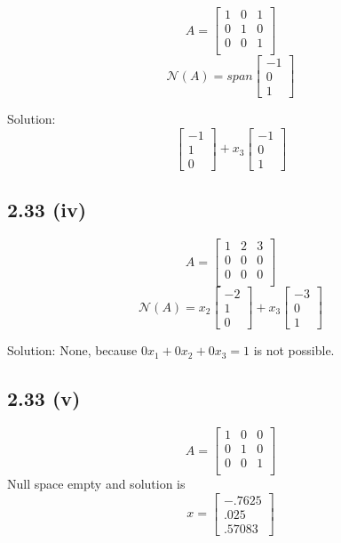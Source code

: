 \documentclass[letterpaper,12pt]{article}
\theoremstyle{definition}
\begin{document}
\[A =
\begin{bmatrix}
    1 & 0 & 1 \\
    0 & 1 & 0 \\
    0 & 0 & 1 \\
\end{bmatrix}
\]
\[ \mathscr{N} (A) = span 
\begin{bmatrix}
    -1 \\
    0\\
    1
\end{bmatrix}
\]

Solution:
\[
\begin{bmatrix}
    -1\\1\\0
\end{bmatrix}
+
x_3
\begin{bmatrix}
    -1\\0\\1
\end{bmatrix}
\]


\subsection*{2.33 (iv)}

\[A =
\begin{bmatrix}
    1 & 2 & 3 \\
    0 & 0 & 0 \\
    0 & 0 & 0 \\
\end{bmatrix}
\]
\[ \mathscr{N} (A) = x_2
\begin{bmatrix}
    -2 \\
    1\\
    0
\end{bmatrix}
+x_3
\begin{bmatrix}
    -3 \\
    0\\
    1
\end{bmatrix}
\]

Solution: None, because $0x_1 + 0x_2 +0x_3  = 1$ is not possible.

\subsection*{2.33 (v)}

\[A =
\begin{bmatrix}
    1 & 0 & 0 \\
    0 & 1 & 0 \\
    0 & 0 & 1 \\
\end{bmatrix}
\]
Null space empty and solution is
\[x =
\begin{bmatrix}
    -.7625\\
    .025\\
    .57083
\end{bmatrix}\]
\end{document}
